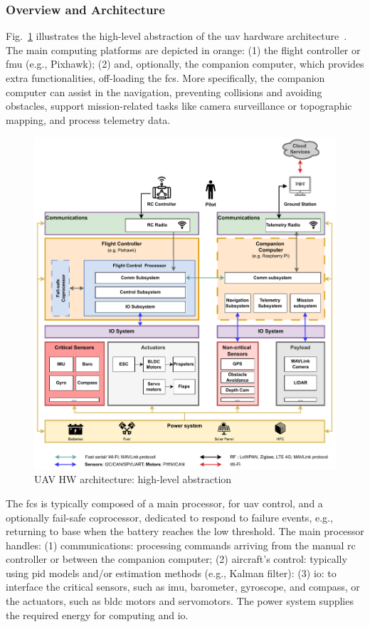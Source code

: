 \subsubsection{Overview and Architecture}%
\label{sec:overv-arch-hw}
Fig.~\ref{fig:uav-hw-arch} illustrates the high-level abstraction of the
\gls{uav} hardware architecture~\cite{leccadito2018survey,px4-sysArch}. The main
computing platforms are depicted in orange: (1) the flight controller or
\gls{fmu} (e.g., Pixhawk); (2) and, optionally,
the companion computer, which provides extra functionalities, off-loading the \gls{fcs}. More specifically, the companion computer can assist in the
navigation, preventing collisions and avoiding obstacles, support
mission-related tasks like camera surveillance or topographic mapping, and
process telemetry data.

\begin{figure}[!hbt]
  \centering
  \includegraphics[width=1.0\textwidth]{./img/pdf/uav-hw-arch.pdf} 
  \caption{UAV HW architecture: high-level abstraction}%
  \label{fig:uav-hw-arch}
\end{figure}

The \gls{fcs} is typically composed of a main processor, for \gls{uav} control,
and a optionally fail-safe coprocessor, dedicated to respond to failure events,
e.g., returning to base when the battery reaches the low threshold.
The main processor handles: (1) communications: processing commands arriving
from the manual \gls{rc} controller or between the companion computer; (2)
aircraft's control: typically using \gls{pid} models and/or estimation methods
(e.g., Kalman filter): (3) \gls{io}: to
interface the critical sensors, such as \gls{imu}, barometer, gyroscope, and
compass, or the actuators, such as \gls{bldc} motors and servomotors.
The power system supplies the required energy for computing and \gls{io}.


